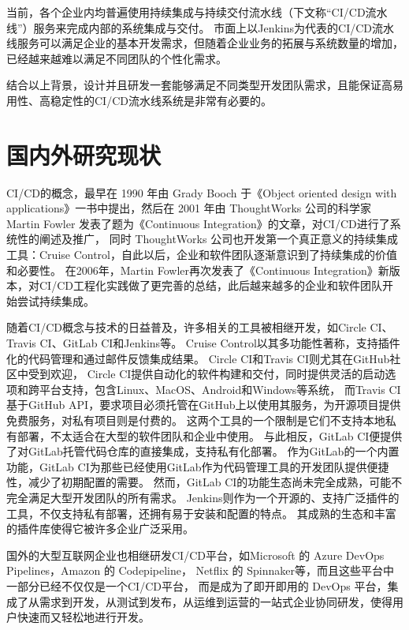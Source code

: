 当前，各个企业内均普遍使用持续集成与持续交付流水线（下文称“CI/CD流水线”）服务来完成内部的系统集成与交付\cite{1013369056.nh}。
市面上以Jenkins为代表的CI/CD流水线服务可以满足企业的基本开发需求，但随着企业业务的拓展与系统数量的增加，已经越来越难以满足不同团队的个性化需求。

结合以上背景，设计并且研发一套能够满足不同类型开发团队需求，且能保证高易用性、高稳定性的CI/CD流水线系统是非常有必要的。


\section{国内外研究现状}
CI/CD的概念，最早在 1990 年由 Grady Booch 于《Object oriented design with applications》一书中提出\cite{booch1990object}，然后在 2001 年由 ThoughtWorks 公司的科学家 Martin Fowler 发表了题为《Continuous Integration》的文章，对CI/CD进行了系统性的阐述及推广\cite{CI首作}，
同时 ThoughtWorks 公司也开发第一个真正意义的持续集成工具：Cruise Control\cite{绪论持续集成1}，自此以后，企业和软件团队逐渐意识到了持续集成的价值和必要性。
在2006年，Martin Fowler再次发表了《Continuous Integration》新版本，对CI/CD工程化实践做了更完善的总结\cite{fowler2006continuous}，此后越来越多的企业和软件团队开始尝试持续集成。

随着CI/CD概念与技术的日益普及，许多相关的工具被相继开发，如Circle CI、Travis CI、GitLab CI和Jenkins等。
Cruise Control以其多功能性著称，支持插件化的代码管理和通过邮件反馈集成结果\cite{徐仕成2007基于}。
Circle CI和Travis CI则尤其在GitHub社区中受到欢迎，
Circle CI提供自动化的软件构建和交付，同时提供灵活的启动选项和跨平台支持，包含Linux、MacOS、Android和Windows等系统\cite{hoang2020jamstack}，
而Travis CI基于GitHub API，要求项目必须托管在GitHub上以使用其服务，为开源项目提供免费服务，对私有项目则是付费的\cite{2018Use}。
这两个工具的一个限制是它们不支持本地私有部署，不太适合在大型的软件团队和企业中使用。
与此相反，GitLab CI便提供了对GitLab托管代码仓库的直接集成，支持私有化部署。
作为GitLab的一个内置功能，GitLab CI为那些已经使用GitLab作为代码管理工具的开发团队提供便捷性，减少了初期配置的需要。
然而，GitLab CI的功能生态尚未完全成熟，可能不完全满足大型开发团队的所有需求。
Jenkins则作为一个开源的、支持广泛插件的工具\cite{林新党2014基于}，不仅支持私有部署，还拥有易于安装和配置的特点。
其成熟的生态和丰富的插件库使得它被许多企业广泛采用。

国外的大型互联网企业也相继研发CI/CD平台，如Microsoft 的 Azure DevOps Pipelines，Amazon 的 Codepipeline，
Netflix 的 Spinnaker等，而且这些平台中一部分已经不仅仅是一个CI/CD平台，
而是成为了即开即用的 DevOps 平台，集成了从需求到开发，从测试到发布，从运维到运营的一站式企业协同研发，使得用户快速而又轻松地进行开发。


